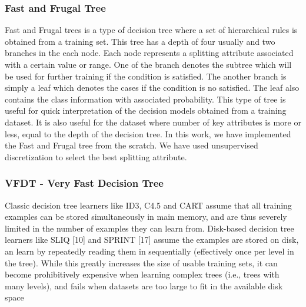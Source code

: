 \documentclass[sigplan]{acmart}\settopmatter{printfolios=true,printccs=false,printacmref=false}
\begin{document}
\subsubsection{Fast and Frugal Tree}
Fast and Frugal trees is a type of decision tree where a set of hierarchical rules is obtained from a training set. This tree has a depth of four usually and two branches in the each node. Each node represents a splitting attribute associated with a certain value or range. One of the branch denotes the subtree which will be used for further training if the condition is satisfied. The another branch is simply a leaf which denotes the cases if the condition is no satisfied. The leaf also contains the class information with associated probability. This type of tree is useful for quick interpretation of the decision models obtained from a training dataset. It is also useful for the dataset where number of key attributes is more or less, equal to the depth of the decision tree. In this work, we have implemented the Fast and Frugal tree from the scratch. We have used unsupervised discretization to select the best splitting attribute. 

\subsubsection{VFDT - Very Fast Decision Tree}
Classic decision tree learners like ID3, C4.5 and CART assume that all training examples can be stored simultaneously in main memory, and are thus
severely limited in the number of examples they can learn from. Disk-based decision tree learners like SLIQ [10] and SPRINT [17] assume the examples are stored on disk, an 
learn by repeatedly reading them in sequentially (effectively once per level in the tree). While this greatly increases the
size of usable training sets, it can become prohibitively expensive when learning complex trees (i.e., trees with many levels), and fails when datasets are too large to fit in the
available disk space
\end{document}
